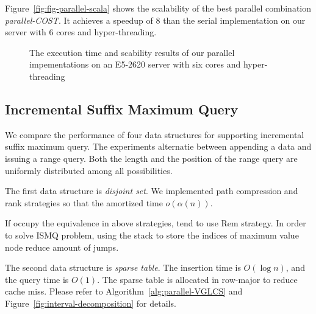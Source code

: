 Figure~\ref{fig:fig-parallel-scala} shows the scalability of the best
parallel combination {\em parallel-COST}.  It achieves a speedup of
$8$ than the serial implementation on our server with 6 cores and
hyper-threading.

\iffalse
我們運行優化策略中的空間壓縮版本，而非理論分析的 $\theta(1)$ 操作，
單次詢問落在 $O(s)$ 中，在實作上由於可以完全壓在暫存器上操作，效能表現較佳。
\fi

\begin{figure}
  \centering
  \caption{The execution time and scability results of our parallel
    impementations on an E5-2620 server with six cores and
    hyper-threading}
\end{figure}



\subsection{Incremental Suffix Maximum Query}

We compare the performance of four data structures for supporting
incremental suffix maximum query.  The experiments alternatie between
appending a data and issuing a range query.  Both the length and the
position of the range query are uniformly distributed among all
possibilities.

\iffalse
針對插入和詢問次數相同的 ISMQ 問題，運行以下四種數據結構：
\fi

The first data structure is {\em disjoint set}.  We implemented path
compression and rank strategies so that the amortized time
$o(\alpha(n))$.

If occupy the equivalence in above strategies, tend to use {\sc Rem}
strategy.  In order to solve ISMQ problem, using the stack to store
the indices of maximum value node reduce amount of jumps.

The second data structure is {\em sparse table}.  The insertion time
is $O(\log n)$, and the query time is $O(1)$.  The sparse table is
allocated in row-major to reduce cache miss.  Please refer to
Algorithm~\ref{alg:parallel-VGLCS} and
Figure~\ref{fig:interval-decomposition} for details.

